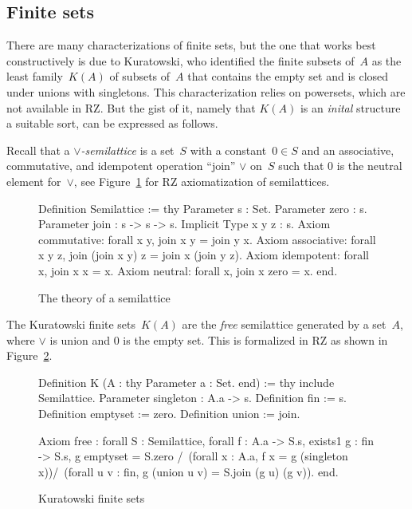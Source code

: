 \subsection{Finite sets}
\label{sec:finite-sets}

There are many characterizations of finite sets, but the one that
works best constructively is due to Kuratowski, who identified the
finite subsets of~$A$ as the least family~$K(A)$ of subsets of~$A$
that contains the empty set and is closed under unions with
singletons. This characterization relies on powersets, which are not
available in RZ. But the gist of it, namely that $K(A)$ is an
\emph{inital} structure a suitable sort, can be expressed as follows.

Recall that a \emph{$\vee$-semilattice} is a set~$S$ with a
constant~$0 \in S$ and an associative, commutative, and idempotent
operation ``join'' $\vee$ on~$S$ such that $0$ is the neutral element
for~$\vee$, see Figure~\ref{fig:semilattice} for RZ axiomatization of
semilattices.
%
\begin{figure}
  \centering
\begin{source}
Definition Semilattice :=
thy
  Parameter s : Set.
  Parameter zero : s.
  Parameter join : s -> s -> s.
  Implicit Type x y z : s.
  Axiom commutative: forall x y,   join x y = join y x.
  Axiom associative: forall x y z, join (join x y) z = join x (join y z).
  Axiom idempotent:  forall x,     join x x = x.
  Axiom neutral:     forall x,     join x zero = x.
end.
\end{source}
  \caption{The theory of a semilattice}
  \label{fig:semilattice}
\end{figure}
%
The Kuratowski finite sets~$K(A)$ are the \emph{free} semilattice
generated by a set~$A$, where $\vee$ is union and $0$ is the empty
set. This is formalized in RZ as shown in Figure~\ref{fig:kuratowski}.
%
\begin{figure}
\centering
\begin{source}
Definition K (A : thy 
                Parameter a : Set.
              end) :=
thy
  include Semilattice.
  Parameter singleton : A.a -> s.
  Definition fin := s.
  Definition emptyset := zero.
  Definition union := join.

  Axiom free :
    forall S : Semilattice, forall f : A.a -> S.s,
    exists1 g : fin -> S.s, 
      g emptyset = S.zero /\
        (forall x : A.a, f x = g (singleton x))/\
        (forall u v : fin, g (union u v) = S.join (g u) (g v)).
end.
\end{source}
  \caption{Kuratowski finite sets}
  \label{fig:kuratowski}
\end{figure}
